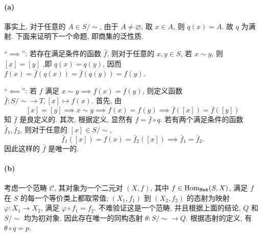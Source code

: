 \documentclass{article}
\begin{document}
\begin{solution}
	\paragraph{(a)} 事实上, 对于任意的 $A \in S/{\sim}$, 由于 $A \neq \varnothing$, 取 $x \in A$, 则 $q(x) = A$. 故 $q$ 为满射. 下面来证明下一个命题, 即商集的泛性质.

	``$\implies$'': 若存在满足条件的函数 $\bar{f}$, 则对于任意的 $x, y\in S$, 若 $x \sim y$, 则 $[x] = [y]$ ,即 $q(x) = q(y)$, 因而 $f(x) = \bar{f}(q(x)) = \bar{f}(q(y)) = f(y)$.

	``$\impliedby$'': 若 $f$ 满足 $x \sim y \implies f(x) = f(y)$, 则定义函数 $\bar{f}: S/{\sim} \to T, [x] \mapsto f(x)$. 首先, 由
	\[ [x] = [y] \implies x \sim y \implies f(x) = f(y) \implies \bar{f}([x]) = \bar{f}([y]) \]
	知 $\bar{f}$ 是良定义的. 其次, 根据定义, 显然有 $f = \bar{f} \circ q$. 若有两个满足条件的函数 $\bar{f}_1, \bar{f}_2$, 则对于任意的 $[x] \in S/{\sim}$,
	\[ \bar{f}_1([x]) = f(x) = \bar{f}_2([x]) \implies \bar{f}_1 = \bar{f}_2. \]
	因此这样的 $\bar{f}$ 是唯一的.

	\paragraph{(b)} 考虑一个范畴 $\mathcal{C}$, 其对象为一个二元对 $(X,f)$, 其中 $f \in \operatorname{Hom}_{\mathbf{Set}}(S,X)$, 满足 $f$ 在 $S$ 的每一个等价类上都取常值; $(X_1, f_1)$ 到 $(X_2, f_2)$ 的态射为映射 $\varphi: X_1 \to X_2$, 满足 $\varphi \circ f_1 = f_2$. 不难验证这是一个范畴, 并且根据上面的结论, $Q$ 和 $S/{\sim}$ 均为初对象. 因此存在唯一的同构态射 $\theta: S/{\sim} \to Q$. 根据态射的定义, 有 $\theta \circ q = p$.
\end{solution}
\end{document}

